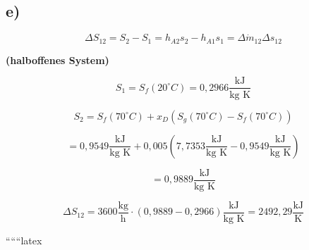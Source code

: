 

\subsection*{e)}

\[
\Delta S_{12} = S_2 - S_1 = h_{A2} s_2 - h_{A1} s_1 = \Delta \dot{m}_{12} \Delta s_{12}
\]

\textbf{(halboffenes System)}

\[
S_1 = S_f(20^\circ C) = 0{,}2966 \frac{\text{kJ}}{\text{kg K}}
\]

\[
S_2 = S_f(70^\circ C) + x_D \left( S_g(70^\circ C) - S_f(70^\circ C) \right)
\]

\[
= 0{,}9549 \frac{\text{kJ}}{\text{kg K}} + 0{,}005 \left( 7{,}7353 \frac{\text{kJ}}{\text{kg K}} - 0{,}9549 \frac{\text{kJ}}{\text{kg K}} \right)
\]

\[
= 0{,}9889 \frac{\text{kJ}}{\text{kg K}}
\]

\[
\Delta S_{12} = 3600 \frac{\text{kg}}{\text{h}} \cdot (0{,}9889 - 0{,}2966) \frac{\text{kJ}}{\text{kg K}} = 2492{,}29 \frac{\text{kJ}}{\text{K}}
\]

``````latex